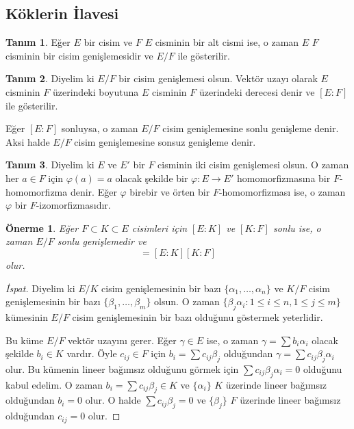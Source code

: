 \documentclass[draft]{article}
\newtheorem{prop}[thm]{Önerme}
\theoremstyle{definition}
\newtheorem{defn}{Tanım}[section]
\theoremstyle{remark}
\begin{document}
		\subsection{Köklerin İlavesi}
		
			\begin{defn}
			    Eğer $E$ bir cisim ve $F$ $E$ cisminin bir alt cismi ise, o zaman $E$ $F$ cisminin bir cisim genişlemesidir ve $E/F$ ile gösterilir.
			\end{defn}
			
			\begin{defn}
			    Diyelim ki $E/F$ bir cisim genişlemesi olsun. Vektör uzayı olarak $E$ cisminin $F$ üzerindeki boyutuna $E$ cisminin $F$ üzerindeki derecesi denir ve $[E:F]$ ile gösterilir.\par
			    Eğer $[E : F]$ sonluysa, o zaman $E/F$ cisim genişlemesine sonlu genişleme denir. Aksi halde $E/F$ cisim genişlemesine sonsuz genişleme denir.
			\end{defn}
			
			\begin{defn}
			    Diyelim ki $E$ ve $E'$ bir $F$ cisminin iki cisim genişlemesi olsun. O zaman her $a \in F$ için $\varphi(a) = a$ olacak şekilde bir $\varphi:  E \to E'$ homomorfizmasına bir $F$-homomorfizma denir. Eğer $\varphi$ birebir ve örten bir $F$-homomorfizması ise, o zaman $\varphi$ bir $F$-izomorfizmasıdır.
			\end{defn}
			
			\begin{prop}
				Eğer $F \subset K \subset E$ cisimleri için $[E : K]$ ve $[K : F]$ sonlu ise, o zaman $E/F$ sonlu genişlemedir ve
				\begin{equation*}
					[E : F] = [E : K][K : F]
				\end{equation*}
				olur.
			\end{prop}
			
			\begin{proof}[İspat]
			    Diyelim ki $E/K$ cisim genişlemesinin bir bazı $\{\alpha_1, \dots, \alpha_n\}$ ve $K/F$ cisim genişlemesinin bir bazı $\{\beta_1, \dots, \beta_m\}$ olsun. O zaman $\{\beta_j\alpha_i : 1 \leq i \leq n, 1 \leq j \leq m\}$ kümesinin $E/F$ cisim genişlemesinin bir bazı olduğunu göstermek yeterlidir.\par
			    Bu küme $E/F$ vektör uzayını gerer. Eğer $\gamma \in E$ ise, o zaman $\gamma = \sum{b_i\alpha_i}$ olacak şekilde $b_i \in K$ vardır. Öyle $c_{ij} \in F$ için $b_i = \sum{c_{ij}\beta_j}$ olduğundan $\gamma = \sum{c_{ij}\beta_j\alpha_i}$ olur. Bu kümenin lineer bağımsız olduğunu görmek için $\sum{c_{ij}\beta_j\alpha_i} = 0$ olduğunu kabul edelim. O zaman $b_i = \sum{c_{ij}\beta_j} \in K$ ve $\{\alpha_i\}$ $K$ üzerinde lineer bağımsız olduğundan $b_i = 0$ olur. O halde $\sum{c_{ij}\beta_j} = 0$ ve $\{\beta_j\}$ $F$ üzerinde lineer bağımsız olduğundan $c_{ij} = 0$ olur.
			\end{proof}
			
\end{document}
